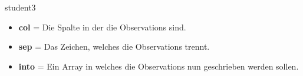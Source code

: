 \begin{rcode}{1}
student3 %
\end{rcode}
\begin{itemize}[noitemsep]
  \item \textbf{col} = Die Spalte in der die Observations sind.
  \item \textbf{sep} = Das Zeichen, welches die Observations trennt.
  \item \textbf{into} = Ein Array in welches die Observations nun geschrieben werden sollen.
\end{itemize}


